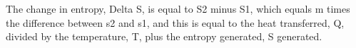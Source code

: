 The change in entropy, Delta S, is equal to S2 minus S1, which equals m times the difference between s2 and s1, and this is equal to the heat transferred, Q, divided by the temperature, T, plus the entropy generated, S generated.